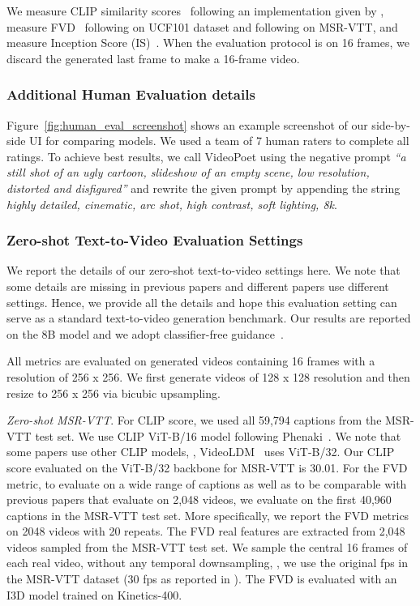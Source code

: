 We measure CLIP similarity scores~\cite{wu2021godiva} following an implementation given by \citet{villegas2022phenaki}, measure FVD~\cite{unterthiner2018towards} following \citet{yu2023magvit} on UCF101 dataset and following \citet{zhang2023show} on MSR-VTT, and measure Inception Score (IS)~\cite{saito2020train}. When the evaluation protocol is on 16 frames, we discard the generated last frame to make a 16-frame video.


\subsubsection{Additional Human Evaluation details}
\label{sec:appendix-human-evaluation}



Figure~\ref{fig:human_eval_screenshot} shows an example screenshot
of our side-by-side UI for comparing models.  We used a team of 7
human raters to complete all ratings.  To achieve best results, we
call VideoPoet using the negative prompt \emph{``a
still shot of an ugly cartoon, slideshow of an empty scene,
low resolution, distorted and disfigured''}
and rewrite the given prompt by appending the string
\emph{highly detailed, cinematic, arc shot, high contrast, soft lighting, 8k}.

\subsubsection{Zero-shot Text-to-Video Evaluation Settings}
\label{sec:appendix-evaluation}
We report the details of our zero-shot text-to-video settings here.
We note that some details are missing in previous papers and different papers use different settings. Hence, we provide all the details and hope this evaluation setting can serve as a standard text-to-video generation benchmark.
Our results are reported on the 8B model and we adopt classifier-free guidance~\cite{ho2022classifier}.

\vspace{-2mm}
All metrics are evaluated on generated videos containing 16 frames with a resolution of 256 x 256.
We first generate videos of 128 x 128 resolution and then resize to 256 x 256 via bicubic upsampling.

\emph{Zero-shot MSR-VTT}.
For CLIP score, we used all 59,794 captions from the MSR-VTT test set. We use CLIP ViT-B/16 model following Phenaki~\cite{villegas2022phenaki}.
We note that some papers use other CLIP models, \eg, VideoLDM~\cite{blattmann2023align} uses ViT-B/32.
Our CLIP score evaluated on the ViT-B/32 backbone for MSR-VTT is 30.01.
For the FVD metric, to evaluate on a wide range of captions as well as to be comparable with previous papers that evaluate on 2,048 videos, we evaluate on the first 40,960 captions in the MSR-VTT test set. More specifically, we report the FVD metrics on 2048 videos with 20 repeats.
The FVD real features are extracted from 2,048 videos sampled from the MSR-VTT test set.
We sample the central 16 frames of each real video, without any temporal downsampling, \ie, we use the original fps in the MSR-VTT dataset (30 fps as reported in \citet{xu2016msr}). The FVD is evaluated with an I3D model trained on Kinetics-400.

